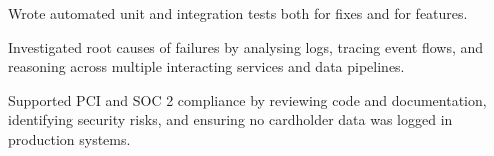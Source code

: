 \documentclass[letterpaper,11pt]{article}
\newcommand{\resumeItem}[1]{
	\item\small{
		{#1 \vspace{-2pt}}
	}
}
\begin{document}
	\resumeItem{Wrote automated unit and integration tests both for fixes and for features.}
	

	\resumeItem{Investigated root causes of failures by analysing logs, tracing event flows, and reasoning across multiple interacting services and data pipelines.}
	
	
	
	\resumeItem{Supported PCI and SOC 2 compliance by reviewing code and documentation, identifying security risks, and ensuring no cardholder data was logged in production systems. }
	




	
	




	
	

	
	
\end{document}
